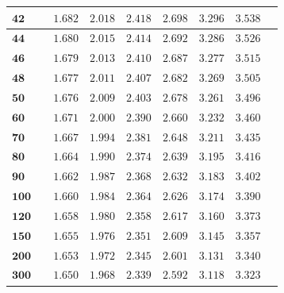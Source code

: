 \begin{customTableWrapper}{1.3}
\begin{longtable}{|l|l l|l|l|l|l|l|l|}
    $\mathbf{42}$ & & ${1.682}$   & ${2.018}$   & ${2.418}$   & ${2.698}$   & ${3.296}$   & ${3.538}$   \\ \hline
    
    $\mathbf{44}$ & & ${1.680}$   & ${2.015}$   & ${2.414}$   & ${2.692}$   & ${3.286}$   & ${3.526}$   \\ \hline
    
    $\mathbf{46}$ & & ${1.679}$   & ${2.013}$   & ${2.410}$   & ${2.687}$   & ${3.277}$   & ${3.515}$   \\ \hline
    
    $\mathbf{48}$ & & ${1.677}$   & ${2.011}$   & ${2.407}$   & ${2.682}$   & ${3.269}$   & ${3.505}$   \\ \hline
    
    $\mathbf{50}$ & & ${1.676}$   & ${2.009}$   & ${2.403}$   & ${2.678}$   & ${3.261}$   & ${3.496}$   \\ \hline
    
    $\mathbf{60}$ & & ${1.671}$   & ${2.000}$   & ${2.390}$   & ${2.660}$   & ${3.232}$   & ${3.460}$   \\ \hline
    
    $\mathbf{70}$ & & ${1.667}$   & ${1.994}$   & ${2.381}$   & ${2.648}$   & ${3.211}$   & ${3.435}$   \\ \hline
    
    $\mathbf{80}$ & & ${1.664}$   & ${1.990}$   & ${2.374}$   & ${2.639}$   & ${3.195}$   & ${3.416}$   \\ \hline
    
    $\mathbf{90}$ & & ${1.662}$   & ${1.987}$   & ${2.368}$   & ${2.632}$   & ${3.183}$   & ${3.402}$   \\ \hline
    
    $\mathbf{100}$ & & ${1.660}$   & ${1.984}$   & ${2.364}$   & ${2.626}$   & ${3.174}$   & ${3.390}$   \\ \hline
    
    $\mathbf{120}$ & & ${1.658}$   & ${1.980}$   & ${2.358}$   & ${2.617}$   & ${3.160}$   & ${3.373}$   \\ \hline
    
    $\mathbf{150}$ & & ${1.655}$   & ${1.976}$   & ${2.351}$   & ${2.609}$   & ${3.145}$   & ${3.357}$   \\ \hline
    
    $\mathbf{200}$ & & ${1.653}$   & ${1.972}$   & ${2.345}$   & ${2.601}$   & ${3.131}$   & ${3.340}$   \\ \hline
    
    $\mathbf{300}$ & & ${1.650}$   & ${1.968}$   & ${2.339}$   & ${2.592}$   & ${3.118}$   & ${3.323}$   \\ \hline
    

\end{longtable}
\end{customTableWrapper}
